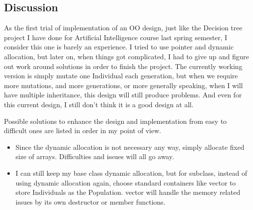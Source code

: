 \documentclass{article}
\begin{document}
\begin{CJK}{UTF8}{gbsn}
\section{Discussion}
As the first trial of implementation of an OO design, just like the Decision tree project I have done for Artificial Intelligence course last spring semester, I consider this one is barely an experience. I tried to use pointer and dynamic allocation, but later on, when things got complicated, I had to give up and figure out work around solutions in order to finish the project. The currently working version is simply mutate one Individual each generation, but when we require more mutations, and more generations, or more generally speaking, when I will have multiple inheritance, this design will still produce problems. And even for this current design, I still don't think it is a good design at all. 

Possible solutions to enhance the design and implementation from easy to difficult ones are listed in order in my point of view. 
\begin{itemize}
\itemsep=-3pt
\item Since the dynamic allocation is not necessary any way, simply allocate fixed size of arrays. Difficulties and issues will all go away. 
\item I can still keep my base class dynamic allocation, but for subclass, instead of using dynamic allocation again, choose standard containers like vector to store Individuals as the Population. vector will handle the memory related issues by its own destructor or member functions. 
\end{itemize}


\end{CJK}
\end{document}
